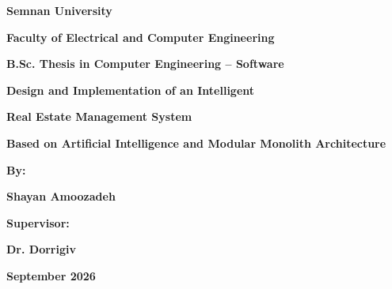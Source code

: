 \documentclass[11pt, a4paper]{report}
\begin{document}
\begin{otherlanguage}{english}
\begin{titlepage}
    \begin{figure}[h]
      \centering
    \end{figure}
    \vspace{0.3cm}
    {\LARGE \bfseries Semnan University \par}
    \vspace{0.5cm}
    {\large \bfseries Faculty of Electrical and Computer Engineering \par}
    \vspace{1.5cm}
    {\normalsize \bfseries B.Sc. Thesis in Computer Engineering -- Software \par}
    \vspace{1.8cm}
    {\huge \bfseries Design and Implementation of an Intelligent \par}
    \vspace{0.3cm}
    {\huge \bfseries Real Estate Management System \par}
    \vspace{0.4cm}
    {\large \bfseries Based on Artificial Intelligence and Modular Monolith Architecture \par}
    \vspace{2.2cm}
    {\normalsize \bfseries By: \par}
    {\Large \bfseries Shayan Amoozadeh \par}
    \vspace{1.5cm}
    {\normalsize \bfseries Supervisor: \par}
    {\Large \bfseries Dr. Dorrigiv \par}
    \vfill
    {\normalsize \bfseries September 2026 \par}
\end{titlepage}
\end{otherlanguage}
\end{document}
